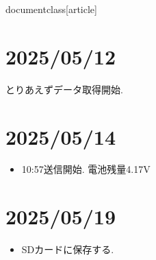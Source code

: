 documentclass[article]



\section{2025/05/12}
とりあえずデータ取得開始.


\section{2025/05/14}
\begin{itemize}
    \item 10:57送信開始. 電池残量4.17V
\end{itemize}

\section{2025/05/19}
\begin{itemize}
    \item SDカードに保存する. 
\end{itemize}





